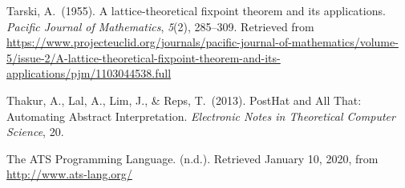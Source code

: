 \documentclass[12pt,twoside]{article}
\begin{document}
{\begin{thebibliography}{1079}
\mdbibitemlabel{}Tarski, A.~(1955). A lattice-theoretical fixpoint theorem and its applications. \emph{Pacific Journal of Mathematics}, \emph{5}(2), 285–309. Retrieved from \href{https://www.projecteuclid.org/journals/pacific-journal-of-mathematics/volume-5/issue-2/A-lattice-theoretical-fixpoint-theorem-and-its-applications/pjm/1103044538.full}{{\ttfamily https://\hspace{0pt}www.\hspace{0pt}projecteuclid.\hspace{0pt}org/\hspace{0pt}journals/\hspace{0pt}pacific-\hspace{0pt}journal-\hspace{0pt}of-\hspace{0pt}mathematics/\hspace{0pt}volume-\hspace{0pt}5/\hspace{0pt}issue-\hspace{0pt}2/\hspace{0pt}A-\hspace{0pt}lattice-\hspace{0pt}theoretical-\hspace{0pt}fixpoint-\hspace{0pt}theorem-\hspace{0pt}and-\hspace{0pt}its-\hspace{0pt}applications/\hspace{0pt}pjm/\hspace{0pt}1103044538.\hspace{0pt}full}}%

\mdbibitemlabel{}Thakur, A., Lal, A., Lim, J., \& Reps, T.~(2013). PostHat and All That: Automating Abstract Interpretation. \emph{Electronic Notes in Theoretical Computer Science}, 20.%

\mdbibitemlabel{}The ATS Programming Language. (n.d.). Retrieved January 10, 2020, from \href{http://www.ats-lang.org/}{{\ttfamily http://\hspace{0pt}www.\hspace{0pt}ats-\hspace{0pt}lang.\hspace{0pt}org/\hspace{0pt}}}%


\end{thebibliography}}
\end{document}
